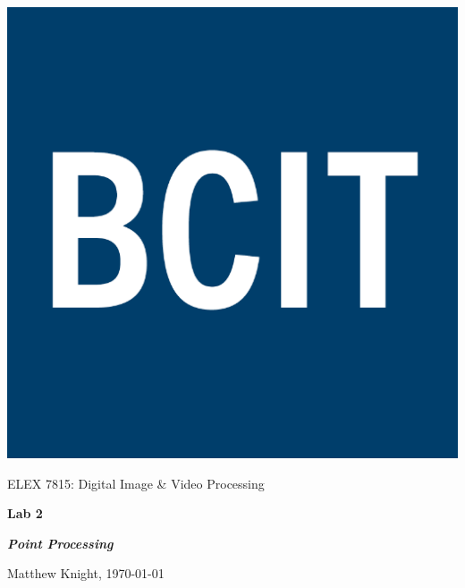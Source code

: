 \documentclass[12pt]{article}
\begin{document}
 

\thispagestyle{titlePage}

\includegraphics[scale=0.12]{BCIT}
\bigskip

\begin{center}
    
    {\fontsize{24pt}{6pt}\selectfont ELEX 7815: Digital Image \& Video Processing}
    
    \vspace{12pt}
    
    {\fontsize{28pt}{12pt}\selectfont\bfseries Lab 2}
    
    \vspace{12pt}
    
    {\fontsize{26pt}{12pt}\selectfont\bfseries\itshape Point Processing}
    
    \vspace{12pt}
    
    {\fontsize{16pt}{12pt}\selectfont Matthew Knight, \today}
    
    \vspace{24pt}

\end{center}

\pagebreak

\pagestyle{neilReport}


\end{document}
